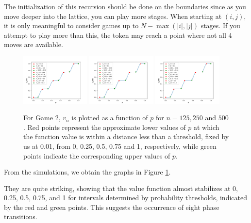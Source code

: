         The initialization of this recursion should be done on the boundaries since as you move deeper into the lattice, you can play more stages. When starting at $(i, j)$, it is only meaningful to consider games up to $N - \max(\lvert i\rvert , \lvert j\rvert )$ stages. If you attempt to play more than this, the token may reach a point where not all 4 moves are available.

        \begin{figure}[!hbt]
            \centering
            \includegraphics[width = 0.31\textwidth]{./images/game2/pN125MAXITER30.png}        
            \includegraphics[width = 0.31\textwidth]{./images/game2/pN250MAXITER30.png}        
            \includegraphics[width = 0.31\textwidth]{./images/game2/pN500MAXITER30.png}
            \caption{For Game 2, $v_{n}$ is plotted as a function of $p$ for $n = 125, 250$ and $500$. Red points represent the approximate lower values of $p$ at which the function value is within a distance less than a threshold, fixed  by us at 0.01, from 0, 0.25, 0.5, 0.75 and 1, respectively, while green points indicate the corresponding upper values of $p$.}
           \label{figurepNgame2}
        \end{figure} 

        From the simulations, we obtain the graphs in Figure \ref{figurepNgame2}.

        They are quite striking, showing that the value function almost stabilizes at 0, 0.25, 0.5, 0.75, and 1 for intervals determined by probability thresholds, indicated by the red and green points. This suggests the occurrence of eight phase transitions.

